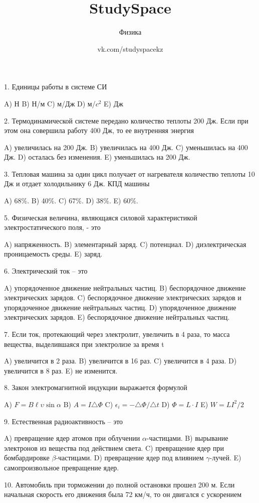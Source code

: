 \documentclass[12pt]{article}
\title{StudySpace}
\author{Физика}
\date{vk.com/studyspacekz}
\begin{document}
\maketitle

1. Единицы работы в системе СИ

A) Н
B) Н/м
C) м/Дж
D) м/$c^2$
E) Дж

2. Термодинамической системе передано количество теплоты 200 Дж. Если при этом она совершила работу 400 Дж, то ее внутренняя энергия

A) увеличилась на 200 Дж.
B) увеличилась на 400 Дж.
C) уменьшилась на 400 Дж.
D) осталась без изменения.
E) уменьшилась на 200 Дж.

3. Тепловая машина за один цикл получает от нагревателя количество теплоты 10 Дж и отдает холодильнику 6 Дж. КПД машины 

A) 68\%.
B) 40\%.
C) 67\%.
D) 38\%.
E) 60\%.

5. Физическая величина, являющаяся силовой характеристикой электростатического поля, - это

A) напряженность.
B) элементарный заряд.
C) потенциал.
D) диэлектрическая проницаемость среды.
E) заряд.

6. Электрический ток – это

A) упорядоченное движение нейтральных частиц.
B) беспорядочное движение электрических зарядов.
C) беспорядочное движение электрических зарядов и 
упорядоченное движение нейтральных частиц.
D) упорядоченное движение электрических зарядов.
E) беспорядочное движение нейтральных частиц. 

7. Если ток, протекающий через электролит, увеличить в 4 раза, то масса вещества, выделившаяся при электролизе за время t

A) увеличится в 2 раза.
B) увеличится в 16 раз.
C) увеличится в 4 раза.
D) увеличится в 8 раз.
E) не изменится. 

8. Закон электромагнитной индукции выражается формулой

A) $F=B \ell \upsilon \sin\alpha$
B) $A=I\triangle \Phi$
C) $\epsilon_i=-\triangle \Phi/\triangle t$
D) $\Phi=L\cdot I$
E) $W=LI^2/2$

9. Естественная радиоактивность – это

A) превращение ядер атомов при облучении $\alpha$-частицами.
B) вырывание электронов из вещества под действием света.
C) превращение ядер при бомбардировке $\beta$-частицами.
D) превращение ядер под влиянием $\gamma$-лучей.
E) самопроизвольное превращение ядер. 

10. Автомобиль при торможении до полной остановки прошел 200 м. Если начальная скорость его движения была 72 км/ч, то он двигался с ускорением
\end{document}
